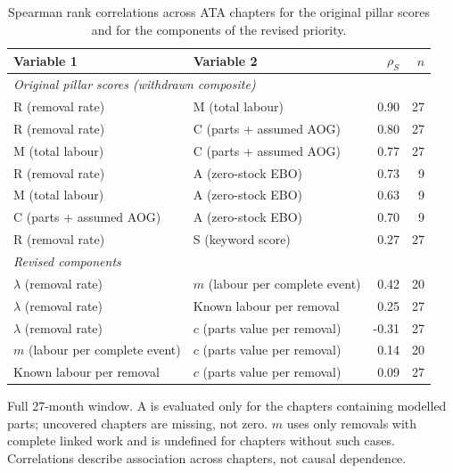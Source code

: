 \begin{table}[htbp]
\centering
\small
\caption{Spearman rank correlations across ATA chapters for the original pillar scores and for the components of the revised priority.}
\label{tab:component-dependence}
\begin{tabular}{llrr}
\toprule
Variable 1 & Variable 2 & $\rho_S$ & $n$ \\
\midrule
\multicolumn{4}{l}{\emph{Original pillar scores (withdrawn composite)}} \\
R (removal rate) & M (total labour) & 0.90 & 27 \\
R (removal rate) & C (parts + assumed AOG) & 0.80 & 27 \\
M (total labour) & C (parts + assumed AOG) & 0.77 & 27 \\
R (removal rate) & A (zero-stock EBO) & 0.73 & 9 \\
M (total labour) & A (zero-stock EBO) & 0.63 & 9 \\
C (parts + assumed AOG) & A (zero-stock EBO) & 0.70 & 9 \\
R (removal rate) & S (keyword score) & 0.27 & 27 \\
\midrule
\multicolumn{4}{l}{\emph{Revised components}} \\
$\lambda$ (removal rate) & $m$ (labour per complete event) & 0.42 & 20 \\
$\lambda$ (removal rate) & Known labour per removal & 0.25 & 27 \\
$\lambda$ (removal rate) & $c$ (parts value per removal) & -0.31 & 27 \\
$m$ (labour per complete event) & $c$ (parts value per removal) & 0.14 & 20 \\
Known labour per removal & $c$ (parts value per removal) & 0.09 & 27 \\
\bottomrule
\end{tabular}
\par\smallskip
{\footnotesize Full 27-month window. A is evaluated only for the chapters containing modelled parts; uncovered chapters are missing, not zero. $m$ uses only removals with complete linked work and is undefined for chapters without such cases. Correlations describe association across chapters, not causal dependence.}
\end{table}
